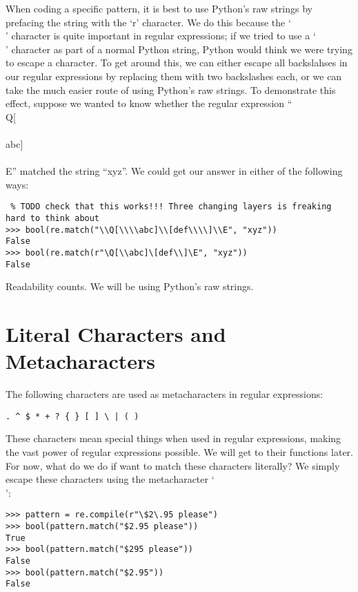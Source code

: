 When coding a specific pattern, it is best to use Python's raw strings by prefacing the string with the `r' character.
We do this because the `\\' character is quite important in regular expressions; if we tried to use a `\\' character as part of a normal Python string, Python would think we were trying to escape a character. To get around this, we can either escape all backslahses in our regular expressions by replacing them with two backslashes each, or we can take the much easier route of using Python's raw strings.
To demonstrate this effect, suppose we wanted to know whether the regular expression ``\\Q[\\\\abc]\\[def\\\\]\\E'' matched the string ``xyz''. We could get our answer in either of the following ways:
\begin{lstlisting} % TODO check that this works!!! Three changing layers is freaking hard to think about
>>> bool(re.match("\\Q[\\\\abc]\\[def\\\\]\\E", "xyz"))
False
>>> bool(re.match(r"\Q[\\abc]\[def\\]\E", "xyz"))
False
\end{lstlisting}

Readability counts. We will be using Python's raw strings.  %

\section*{Literal Characters and Metacharacters}
The following characters are used as metacharacters in regular expressions:
\begin{lstlisting}
. ^ $ * + ? { } [ ] \ | ( )
\end{lstlisting}

These characters mean special things when used in regular expressions, making the vast power of regular expressions possible.
We will get to their functions later. For now, what do we do if want to match these characters literally?
We simply escape these characters using the metacharacter `\\':
\begin{lstlisting}
>>> pattern = re.compile(r"\$2\.95 please")
>>> bool(pattern.match("$2.95 please"))
True
>>> bool(pattern.match("$295 please"))
False
>>> bool(pattern.match("$2.95"))
False
\end{lstlisting}


